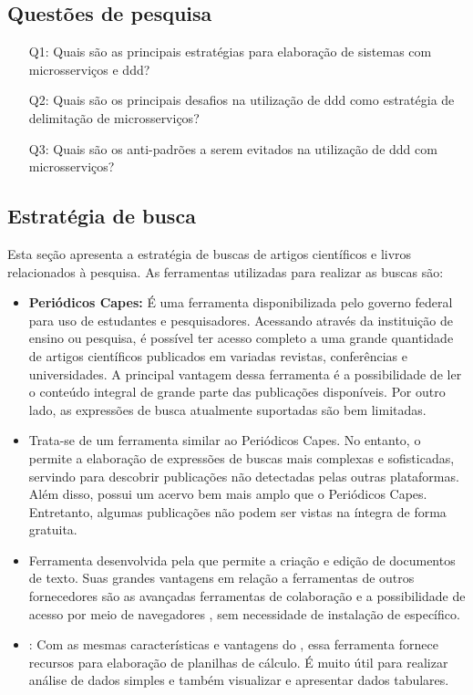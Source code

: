 \subsection{Questões de pesquisa}
\label{section:questoes_pesquisa}
\begin{enumerate}
    \item[Q1:] Quais são as principais estratégias para elaboração de sistemas com microsserviços e \acrshort{ddd}?
    \item[Q2:] Quais são os principais desafios na utilização de \acrshort{ddd} como estratégia de delimitação de microsserviços?
    \item[Q3:] Quais são os anti-padrões a serem evitados na utilização de \acrshort{ddd} com microsserviços?
    
\end{enumerate}

\subsection{Estratégia de busca}
Esta seção apresenta a estratégia de buscas de artigos científicos e livros relacionados à pesquisa. As ferramentas utilizadas para realizar as buscas são:
\begin{itemize}
    \item \textbf{Periódicos Capes:} É uma ferramenta disponibilizada pelo governo federal para uso de estudantes e pesquisadores. Acessando através da instituição de ensino ou pesquisa, é possível ter acesso completo a uma grande quantidade de artigos científicos publicados em variadas revistas, conferências e universidades. A principal vantagem dessa ferramenta é a possibilidade de ler o conteúdo integral de grande parte das publicações disponíveis. Por outro lado, as expressões de busca atualmente suportadas são bem limitadas.
    \item \textbf{} Trata-se de um ferramenta similar ao Periódicos Capes. No entanto, o  permite a elaboração de expressões de buscas mais complexas e sofisticadas, servindo para descobrir publicações não detectadas pelas outras plataformas. Além disso, possui um acervo bem mais amplo que o Periódicos Capes. Entretanto, algumas publicações não podem ser vistas na íntegra de forma gratuita.
    \item \textbf{} Ferramenta desenvolvida pela  que permite a criação e edição de documentos de texto. Suas grandes vantagens em relação a ferramentas de outros fornecedores são as avançadas ferramentas de colaboração e a possibilidade de acesso por meio de navegadores , sem necessidade de instalação de  específico.
    \item \textbf{}: Com as mesmas características e vantagens do , essa ferramenta fornece recursos para elaboração de planilhas de cálculo. É muito útil para realizar análise de dados simples e também visualizar e apresentar dados tabulares.
\end{itemize}

